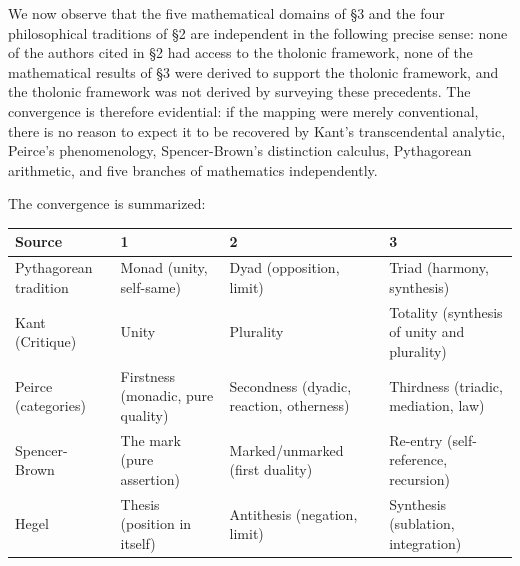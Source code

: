 \documentclass[12pt]{article}
\begin{document}
We now observe that the five mathematical domains of §3 and the four
philosophical traditions of §2 are independent in the following precise
sense: none of the authors cited in §2 had access to the tholonic
framework, none of the mathematical results of §3 were derived to
support the tholonic framework, and the tholonic framework was not
derived by surveying these precedents. The convergence is therefore
evidential: if the mapping were merely conventional, there is no reason
to expect it to be recovered by Kant's transcendental analytic, Peirce's
phenomenology, Spencer-Brown's distinction calculus, Pythagorean
arithmetic, and five branches of mathematics independently.

The convergence is summarized:

\begin{longtable}[]{@{}
  >{\raggedright\arraybackslash}p{}
  >{\raggedright\arraybackslash}p{}
  >{\raggedright\arraybackslash}p{}
  >{\raggedright\arraybackslash}p{}@{}}
\toprule\noalign{}
\begin{minipage}[b]{\linewidth}\raggedright
Source
\end{minipage} & \begin{minipage}[b]{\linewidth}\raggedright
1
\end{minipage} & \begin{minipage}[b]{\linewidth}\raggedright
2
\end{minipage} & \begin{minipage}[b]{\linewidth}\raggedright
3
\end{minipage} \\
\midrule\noalign{}
\endhead
\bottomrule\noalign{}
\endlastfoot
Pythagorean tradition & Monad (unity, self-same) & Dyad (opposition,
limit) & Triad (harmony, synthesis) \\
Kant (Critique) & Unity & Plurality & Totality (synthesis of unity and
plurality) \\
Peirce (categories) & Firstness (monadic, pure quality) & Secondness
(dyadic, reaction, otherness) & Thirdness (triadic, mediation, law) \\
Spencer-Brown & The mark (pure assertion) & Marked/unmarked (first
duality) & Re-entry (self-reference, recursion) \\
Hegel & Thesis (position in itself) & Antithesis (negation, limit) &
Synthesis (sublation, integration) \\

\end{longtable}
\end{document}
